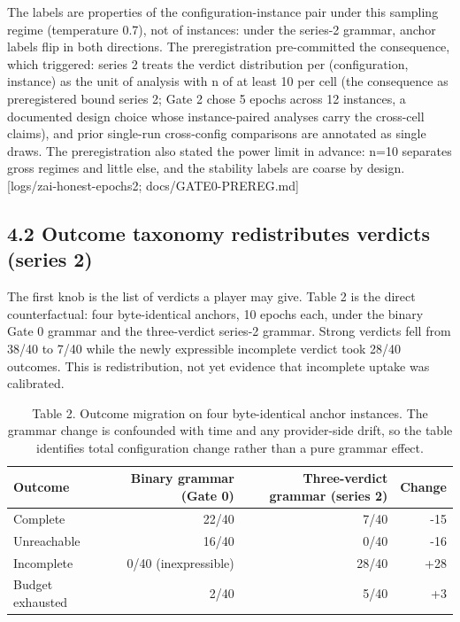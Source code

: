 \documentclass[11pt]{article}
\begin{document}
The labels are properties of the configuration-instance pair under this
sampling regime (temperature 0.7), not of instances: under the series-2
grammar, anchor labels flip in both directions. The preregistration
pre-committed the consequence, which triggered: series 2 treats the
verdict distribution per (configuration, instance) as the unit of
analysis with n of at least 10 per cell (the consequence as
preregistered bound series 2; Gate 2 chose 5 epochs across 12 instances,
a documented design choice whose instance-paired analyses carry the
cross-cell claims), and prior single-run cross-config comparisons are
annotated as single draws. The preregistration also stated the power
limit in advance: n=10 separates gross regimes and little else, and the
stability labels are coarse by design. {[}logs/zai-honest-epochs2;
docs/GATE0-PREREG.md{]}

\subsection*{4.2 Outcome taxonomy redistributes verdicts (series 2)}

The first knob is the list of verdicts a player may give. Table 2 is the
direct counterfactual: four byte-identical anchors, 10 epochs each,
under the binary Gate 0 grammar and the three-verdict series-2 grammar.
Strong verdicts fell from 38/40 to 7/40 while the newly expressible
incomplete verdict took 28/40 outcomes. This is redistribution, not yet
evidence that incomplete uptake was calibrated.

\begin{table}[htbp]
\centering
\caption*{Table 2. Outcome migration on four byte-identical anchor instances. The grammar change is confounded with time and any provider-side drift, so the table identifies total configuration change rather than a pure grammar effect.}
\label{tab:grammar}
\begin{tabular}{lrrr}
\toprule
Outcome & Binary grammar (Gate 0) & Three-verdict grammar (series 2) & Change \\
\midrule
Complete & 22/40 & 7/40 & -15 \\
Unreachable & 16/40 & 0/40 & -16 \\
Incomplete & 0/40 (inexpressible) & 28/40 & +28 \\
Budget exhausted & 2/40 & 5/40 & +3 \\
\bottomrule
\end{tabular}
\end{table}
\end{document}
